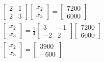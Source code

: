 \begin{subequations}
    \begin{align}
        \begin{bmatrix}
            2 & 1 \\ 
            2 & 3
        \end{bmatrix}\begin{bmatrix}
            x_2 \\ x_3
        \end{bmatrix} = \begin{bmatrix}
            7200\\6000
        \end{bmatrix}\\ 
        \begin{bmatrix}
            x_2\\x_3
        \end{bmatrix}=\frac{1}{4}\begin{bmatrix}
            3 & -1 \\ 
            -2 & 2
        \end{bmatrix}\begin{bmatrix}
            7200\\6000
        \end{bmatrix}\\ 
        \begin{bmatrix}
            x_2\\x_3
        \end{bmatrix}=\begin{bmatrix}
            3900\\-600
        \end{bmatrix}
    \end{align}
\end{subequations}


